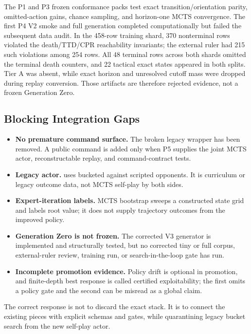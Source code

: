 \documentclass[11pt]{article}
\begin{document}
The P1 and P3 frozen conformance packs test exact transition/orientation
parity, omitted-action gains, chance sampling, and horizon-one MCTS convergence.
The first P4 V2 smoke and full generation completed computationally but failed
the subsequent data audit. In the 458-row training shard, 370 nonterminal rows
violated the death/TTD/CPR reachability invariants; the external ruler had 215
such violations among 254 rows. All 48 terminal rows across both shards omitted
the terminal death counters, and 22 tactical exact states appeared in both
splits. Tier A was absent, while exact horizon and unresolved cutoff mass were
dropped during replay conversion. Those artifacts are therefore rejected
evidence, not a frozen Generation Zero.

\subsection{Blocking Integration Gaps}

\begin{itemize}[leftmargin=*]
  \item \textbf{No premature command surface.}
        The broken legacy  wrapper has been removed.
        A public command is added only when P5 supplies the joint MCTS actor,
        reconstructable replay, and command-contract tests.
  \item \textbf{Legacy actor.}
         uses bucketed
         against scripted opponents. It is curriculum or
        legacy outcome data, not MCTS self-play by both sides.
  \item \textbf{Expert-iteration labels.}
        MCTS bootstrap sweeps a constructed state grid and labels root value;
        it does not supply trajectory outcomes from the improved policy.
  \item \textbf{Generation Zero is not frozen.}
        The corrected V3 generator is implemented and structurally tested, but
        no corrected tiny or full corpus, external-ruler review, training run,
        or search-in-the-loop gate has run.
  \item \textbf{Incomplete promotion evidence.}
        Policy drift is optional in promotion, and finite-depth best response
        is called certified exploitability; the first omits a policy gate and
        the second can be misread as a global claim.
\end{itemize}

The correct response is not to discard the exact stack. It is to connect the
existing pieces with explicit schemas and gates, while quarantining legacy
bucket search from the new self-play actor.
\end{document}
